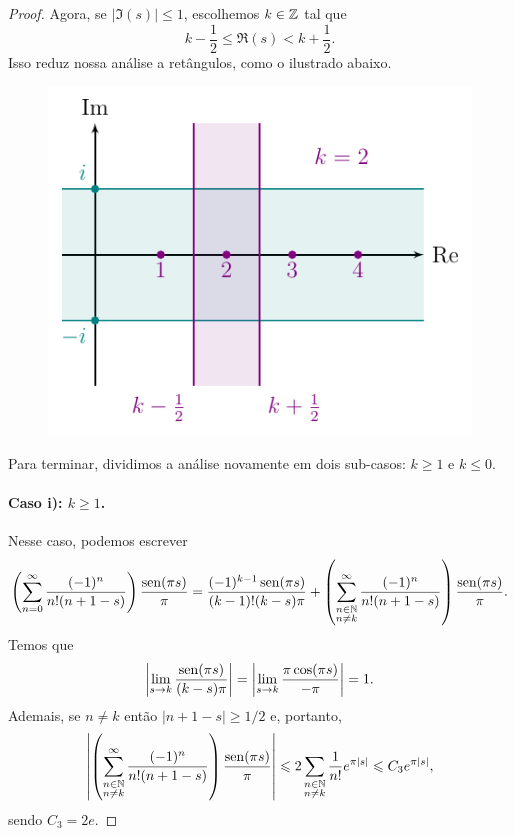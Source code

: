 \begin{proof}
        Agora, se $|\Im(s)| \leq 1$, escolhemos $k\in\mathbb{Z}$ tal que
        \[
        k - \frac{1}{2} \leq \Re(s) < k + \frac{1}{2}.
        \]
        Isso reduz nossa análise a retângulos, como o ilustrado abaixo.
        \begin{figure}[H]\centering
            \includegraphics{Figuras/K>=1.pdf}
        \end{figure}
        Para terminar, dividimos a análise novamente em dois sub-casos: $k\geq 1$ e $k\leq 0$.
        
        \paragraph{Caso i): $k\geq 1$.} Nesse caso, podemos escrever
        \begin{align*}
            \left(\sum_{n=0}^{\infty} \frac{(-1)^n}{n!(n+1-s)}\right)\frac{\operatorname{sen}(\pi s)}{\pi}
            = \frac{(-1)^{k-1}\operatorname{sen}(\pi s)}{(k-1)!(k-s)\pi} +
            \left(\sum_{\substack{n\in\mathbb{N} \\ n\neq k}}^{\infty} 
            \frac{(-1)^n}{n!(n+1-s)}\right)\frac{\operatorname{sen}(\pi s)}{\pi}.
        \end{align*}
        Temos que
        \[
        \left|\lim_{s\to k} \frac{\operatorname{sen}(\pi s)}{(k-s)\pi}\right| 
        = \left|\lim_{s\to k} \frac{\pi\cos(\pi s)}{-\pi}\right|
        = 1.
        \]
        Ademais, se $n\neq k$ então $|n+1-s| \geq 1/2$ e, portanto,
        \begin{align*}
            \left|\left(\sum_{\substack{n\in\mathbb{N} \\ n\neq k}}^{\infty} 
            \frac{(-1)^n}{n!(n+1-s)}\right)\frac{\operatorname{sen}(\pi s)}{\pi}\right|
            \leqslant 2\sum_{\substack{n\in\mathbb{N} \\ n\neq k}} \frac{1}{n!}e^{\pi |s|}
            \leqslant C_3e^{\pi |s|},
        \end{align*}
        sendo $C_3 = 2e$.

\end{proof}
